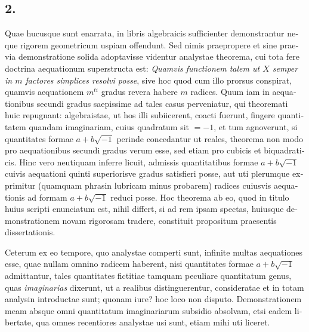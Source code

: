 \documentclass[12pt,a4paper]{article}
\begin{document}
\begin{otherlanguage}{latin}
\subsection*{2.}
Quae hucusque sunt enarrata, in libris algebraicis sufficienter demonstrantur neque rigorem geometricum uspiam offendunt. Sed nimis praepropere et sine praevia demonstratione solida adoptavisse videntur analystae theorema, cui tota fere doctrina aequationum superstructa est: \textit{Quamvis functionem talem ut $X$ semper in $m$ factores simplices resolvi posse}, sive hoc quod cum illo prorsus conspirat, quamvis aequationem $m^{ti}$ gradus revera habere $m$ radices. Quum iam in aequationibus secundi gradus saepissime ad tales casus perveniatur, qui theoremati huic repugnant: algebraistae, ut hos illi subiicerent, coacti fuerunt, fingere quantitatem quandam imaginariam, cuius quadratum sit $=-1$, et tum agnoverunt, si quantitates formae $a+b\sqrt{-1}$ perinde concedantur ut reales, theorema non modo pro aequationibus secundi gradus verum esse, sed etiam pro cubicis et biquadraticis. Hinc vero neutiquam inferre licuit, admissis quantitatibus formae $a+b\sqrt{-1}$ cuivis aequationi quinti superiorisve gradus satisfieri posse, aut uti plerumque exprimitur (quamquam phrasin lubricam minus probarem) radices cuiusvis aequationis ad formam $a+b\sqrt{-1}$ reduci posse. Hoc theorema ab eo, quod in titulo huius scripti enunciatum est, nihil differt, si ad rem ipsam spectas, huiusque demonstrationem novam rigorosam tradere, constituit propositum praesentis dissertationis.

Ceterum ex eo tempore, quo analystae comperti sunt, infinite multas aequationes esse, quae nullam omnino radicem haberent, nisi quantitates formae $a+b\sqrt{-1}$ admittantur, tales quantitates fictitiae tamquam peculiare quantitatum genus, quas \textit{imaginarias} dixerunt, ut a realibus distinguerentur, consideratae et in totam analysin introductae sunt; quonam iure? hoc loco non disputo. Demonstrationem meam absque omni quantitatum imaginariarum subsidio absolvam, etsi eadem libertate, qua omnes recentiores analystae usi sunt, etiam mihi uti liceret.


\end{otherlanguage}
\end{document}
